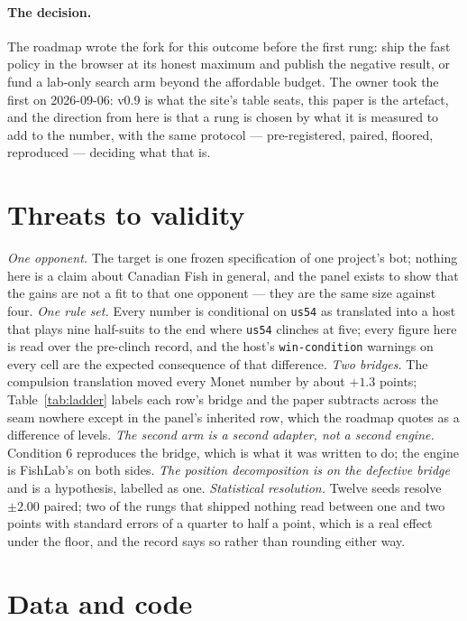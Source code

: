 \documentclass[11pt]{article}
\newcommand{\code}[1]{\texttt{#1}}
\newcommand{\usff}{\code{us54}}
\begin{document}
\paragraph{The decision.} The roadmap wrote the fork for this outcome before the first rung: ship the
fast policy in the browser at its honest maximum and publish the negative result, or fund a lab-only
search arm beyond the affordable budget. The owner took the first on 2026-09-06: v0.9 is what the
site's table seats, this paper is the artefact, and the direction from here is that a rung is chosen
by what it is measured to add to the number, with the same protocol --- pre-registered, paired,
floored, reproduced --- deciding what that is.

\section{Threats to validity}
\label{sec:threats}

\emph{One opponent.} The target is one frozen specification of one project's bot; nothing here is a
claim about Canadian Fish in general, and the panel exists to show that the gains are not a fit to
that one opponent --- they are the same size against four. \emph{One rule set.} Every number is
conditional on \usff{} as translated into a host that plays nine half-suits to the end where \usff{}
clinches at five; every figure here is read over the pre-clinch record, and the host's
\code{win-condition} warnings on every cell are the expected consequence of that difference.
\emph{Two bridges.} The compulsion translation moved every Monet number by about $+1.3$ points;
Table~\ref{tab:ladder} labels each row's bridge and the paper subtracts across the seam nowhere
except in the panel's inherited row, which the roadmap quotes as a difference of levels.
\emph{The second arm is a second adapter, not a second engine.} Condition 6 reproduces the bridge,
which is what it was written to do; the engine is FishLab's on both sides. \emph{The position
decomposition is on the defective bridge} and is a hypothesis, labelled as one. \emph{Statistical
resolution.} Twelve seeds resolve $\pm 2.00$ paired; two of the rungs that shipped nothing read
between one and two points with standard errors of a quarter to half a point, which is a real effect
under the floor, and the record says so rather than rounding either way.

\section*{Data and code}
\end{document}
